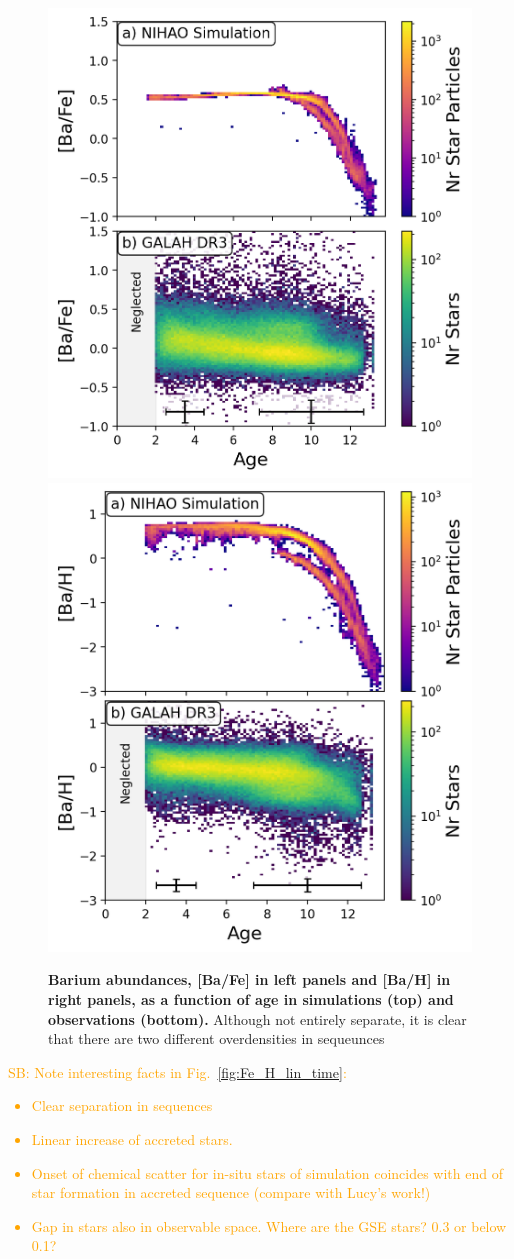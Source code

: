 \documentclass[fleqn,usenatbib]{mnras}
\newcommand{\SB}[1]{{\textcolor{orange}{SB: #1}}}
\begin{document}
\begin{figure}
	\includegraphics[width=0.49\columnwidth]{figures/Ba_Fe_time.png}
	\includegraphics[width=0.49\columnwidth]{figures/Ba_H_time.png}
    \caption{
    \textbf{Barium abundances, [Ba/Fe] in left panels and [Ba/H] in right panels, as a function of age in simulations (top) and observations (bottom).}
    Although not entirely separate, it is clear that there are two different overdensities in sequeunces
    }
    \label{fig:BaHtime}
\end{figure}

\SB{Note interesting facts in Fig.~\ref{fig:Fe_H_lin_time}:
\begin{itemize}
    \item Clear separation in sequences
    \item Linear increase of accreted stars.
    \item Onset of chemical scatter for in-situ stars of simulation coincides with end of star formation in accreted sequence (compare with Lucy's work!)
    \item Gap in stars also in observable space. Where are the GSE stars? 0.3 or below 0.1?
\end{itemize}
}
\end{document}
